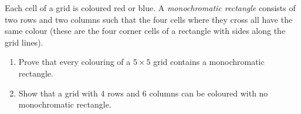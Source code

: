 Each cell of a grid is coloured red or blue. A \emph{monochromatic rectangle} consists of two rows and two columns such that the four cells where they cross all have the same colour (these are the four corner cells of a rectangle with sides along the grid lines).
\begin{enumerate}
\item[(a)] Prove that every colouring of a $5\times5$ grid contains a monochromatic rectangle.
\item[(b)] Show that a grid with $4$ rows and $6$ columns can be coloured with no monochromatic rectangle.
\end{enumerate}

